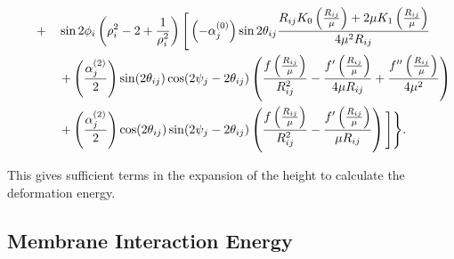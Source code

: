\begin{alignat}{3}
    & && \quad + &&\sin2\phi_i\left(\rho_i^2-2+\frac{1}{\rho_i^2}\right)\Bigg[\left(-\alpha_{j}^{(0)}\right)\sin2\theta_{ij}\frac{R_{ij}K_0\left(\frac{R_{ij}}{\mu}\right)+2\mu K_1\left(\frac{R_{ij}}{\mu}\right)}{{4\mu^2}R_{ij}} \notag\\
    & && &&+ \left(\frac{\alpha_{j}^{(2)}}{2}\right)\sin(2\theta_{ij})\cos(2\psi_j-2\theta_{ij})\left(\frac{f\left(\frac{R_{ij}}{\mu}\right)}{R_{ij}^2}-\frac{f'\left(\frac{R_{ij}}{\mu}\right)}{4 \mu R_{ij}}+\frac{f''\left(\frac{R_{ij}}{\mu}\right)}{4 \mu^2}\right) \notag\\
    & && &&+\left(\frac{\alpha_{j}^{(2)}}{2}\right)\cos(2\theta_{ij})\sin(2\psi_j-2\theta_{ij})\left(\frac{f\left(\frac{R_{ij}}{\mu}\right)}{R_{ij}^2}-\frac{f'\left(\frac{R_{ij}}{\mu}\right)}{\mu R_{ij}}\right)\Bigg]\Bigg\}.
\end{alignat}

This gives sufficient terms in the expansion of the height to calculate the deformation energy.

\subsection{Membrane Interaction Energy}

